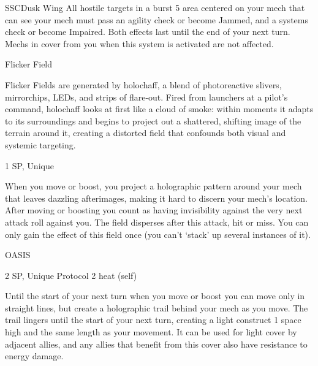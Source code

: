 \begin{mech}{SSC}{Dusk Wing}
All hostile targets in a burst 5 area centered on your mech that can see your mech must pass an agility check or become Jammed, and a systems check or become Impaired. Both effects last until the end of your next turn. Mechs in cover from you when this system is activated are not affected.


Flicker Field

Flicker Fields are generated by holochaff, a blend of photoreactive slivers, mirrorchips, LEDs, and strips of flare-out. Fired from launchers at a pilot's command, holochaff looks at first like a cloud of smoke: within moments it adapts to its surroundings and begins to project out a shattered, shifting image of the terrain around it, creating a distorted field that confounds both visual and systemic targeting.

1 SP, Unique

When you move or boost, you project a holographic pattern around your mech that leaves dazzling afterimages, making it hard to discern your mech's location. After moving or boosting you count as having invisibility against the very next attack roll against you. The field disperses after this attack, hit or miss. You can only gain the effect of this field once (you can't `stack' up several instances of it).


OASIS

2 SP, Unique
Protocol
2 heat (self)

Until the start of your next turn when you move or boost you can move only in straight lines, but create a holographic trail behind your mech as you move. The trail lingers until the start of your next turn, creating a light construct 1 space high and the same length as your movement. It can be used for light cover by adjacent allies, and any allies that benefit from this cover also have resistance to energy damage.

\end{mech}
